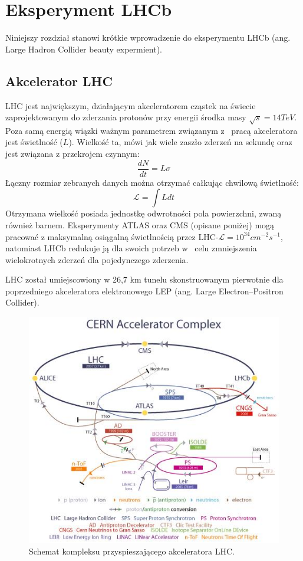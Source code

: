\chapter{Eksperyment LHCb}

Niniejszy rozdział stanowi krótkie wprowadzenie do eksperymentu LHCb (ang. Large Hadron Collider beauty expermient).

\section{Akcelerator LHC}
\indent LHC jest największym, działającym akceleratorem cząstek na świecie zaprojektowanym do zderzania protonów przy energii środka masy $\sqrt{s}=14 TeV$. Poza samą energią wiązki ważnym parametrem związanym z~ pracą akceleratora jest  świetlność ($L$). Wielkość ta, mówi jak wiele zaszło zderzeń na sekundę oraz jest związana z przekrojem czynnym:
\begin{equation}
\frac{dN}{dt} =L \sigma
\end{equation}
Łączny rozmiar zebranych danych można otrzymać całkując chwilową świetlność:
\begin{equation}
\mathcal{L} = \int L dt
\end{equation}
Otrzymana wielkość posiada jednostkę odwrotności pola powierzchni, zwaną również barnem. Eksperymenty ATLAS oraz CMS (opisane poniżej) mogą pracować z maksymalną osiągalną świetlnością przez LHC-$\mathcal{L}=10^{34}cm^{-2}s^{-1}$,  natomiast LHCb redukuje ją dla swoich potrzeb w~ celu zmniejszenia  wielokrotnych zderzeń dla pojedynczego zderzenia. 

LHC został umiejscowiony w 26,7 km tunelu skonstruowanym pierwotnie dla poprzedniego akceleratora elektronowego LEP (ang. Large Electron–Positron Collider). 
\begin{figure}[h]
  \centering
  \includegraphics[scale=1.1]{rozdzial2/AccComple.jpeg}
  \caption{Schemat kompleksu przyspieszającego akceleratora LHC. \cite{public}}
  \label{fig:AccComplex}
\end{figure}

